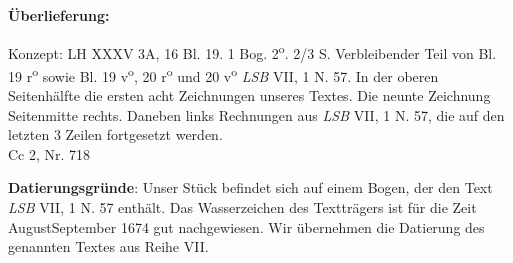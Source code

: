      
               
                \begin{ledgroupsized}[r]{120mm}
                \footnotesize 
                \pstart                
                \noindent\textbf{\"{U}berlieferung:}   
                \pend
                \end{ledgroupsized}
            
              
                            \begin{ledgroupsized}[r]{114mm}
                            \footnotesize 
                            \pstart \parindent -6mm
                            Konzept: LH XXXV 3A, 16 Bl. 19. 1 Bog. 2\textsuperscript{o}. 2/3 S. Verbleibender Teil von Bl. 19 r\textsuperscript{o} sowie Bl. 19 v\textsuperscript{o}, 20 r\textsuperscript{o} und 20 v\textsuperscript{o} \textit{LSB} VII, 1 N. 57. In der oberen Seitenh\"{a}lfte die ersten acht Zeichnungen unseres Textes. Die neunte Zeichnung Seitenmitte rechts. Daneben links Rechnungen aus \textit{LSB} VII, 1 N. 57, die auf den letzten 3 Zeilen fortgesetzt werden.\\Cc 2, Nr. 718 \pend
                            \end{ledgroupsized}
                \vspace*{5mm}
                \begin{ledgroup}
                \footnotesize 
                \pstart
            \noindent\footnotesize{\textbf{Datierungsgr\"{u}nde}: Unser St\"{u}ck befindet sich auf einem Bogen, der den Text \textit{LSB} VII, 1 N. 57 enth\"{a}lt. Das Wasserzeichen des Texttr\"{a}gers ist f\"{u}r die Zeit August\textendash September 1674 gut nachgewiesen. Wir \"{u}bernehmen die Datierung des genannten Textes aus Reihe VII.}
                \pend
                \end{ledgroup}
            
